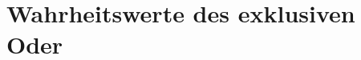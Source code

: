 \documentclass[main.tex]{subfiles}
\begin{document}
\FormulaThmAuto{\top\leftrightarrow \bot \eqvdash \bot}
\begin{tabproofsplit}
  \proofpart{$\vdash$}
    \proofstep{}{\top}{\FormulaRefAuto{\top}}
  \closeproofpart

  \proofpart{$\dashv$}
    \proofstep{}{\top}{\FormulaRefAuto{\top}}
  \closeproofpart
\end{tabproofsplit}

\FormulaThmAuto{\bot\leftrightarrow \top \eqvdash \bot}
\begin{tabproofsplit}
  \proofpart{$\vdash$}
    \proofstep{}{\top}{\FormulaRefAuto{\top}}
  \closeproofpart

  \proofpart{$\dashv$}
    \proofstep{}{\top}{\FormulaRefAuto{\top}}
  \closeproofpart
\end{tabproofsplit}

\FormulaThmAuto{\bot\leftrightarrow \bot \eqvdash \top}
\begin{tabproofsplit}
  \proofpart{$\vdash$}
    \proofstep{}{\top}{\FormulaRefAuto{\top}}
  \closeproofpart

  \proofpart{$\dashv$}
  \closeproofpart
\end{tabproofsplit}

\section{Wahrheitswerte des exklusiven Oder}

\FormulaThmAuto{\top\lxor \top \eqvdash \bot}
\begin{tabproofsplit}
  \proofpart{$\vdash$}
    \proofstep{}{\top}{\FormulaRefAuto{\top}}
  \closeproofpart

  \proofpart{$\dashv$}
    \proofstep{}{\top}{\FormulaRefAuto{\top}}
  \closeproofpart
\end{tabproofsplit}
\end{document}
